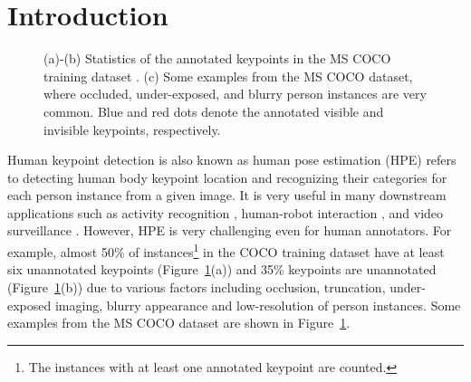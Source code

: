 \documentclass[twocolumn]{svjour3}          \smartqed  \usepackage{natbib}
\begin{document}
\section{Introduction}
\label{sec:introduction}

\begin{figure}[t]
\centering
{}
\vspace{0.00001\linewidth}
\vspace{0.00001\linewidth}

\caption{(a)-(b) Statistics of the annotated keypoints in the MS COCO training dataset \citep{lin2014microsoft}. (c) Some examples from the MS COCO dataset, where occluded, under-exposed, and blurry person instances are very common. Blue and red dots denote the annotated visible and invisible keypoints, respectively. }
\label{fig:coco_stats}
\end{figure}

Human keypoint detection is also known as human pose estimation (HPE) refers to detecting human body keypoint location and recognizing their categories for each person instance from a given image. It is very useful in many downstream applications such as activity recognition \citep{ni2017learning, baradel2018glimpse, liu2018skeleton}, human-robot interaction \citep{mazhar2018towards,zhang2020empowering}, and video surveillance \citep{hattori2018synthesizing, varadarajan2018joint}. However, HPE is very challenging even for human annotators. For example, almost 50\% of instances\footnote{The instances with at least one annotated keypoint are counted.} in the COCO training dataset \citep{lin2014microsoft} have at least six unannotated keypoints (Figure~\ref{fig:coco_stats}(a)) and 35\% keypoints are unannotated (Figure~\ref{fig:coco_stats}(b)) due to various factors including occlusion, truncation, under-exposed imaging, blurry appearance and low-resolution of person instances.  Some examples from the MS COCO dataset are shown in Figure~\ref{fig:coco_stats}.
\end{document}
